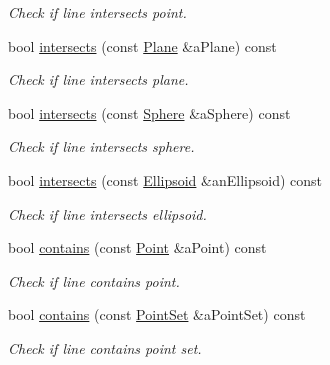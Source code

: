 \begin{DoxyCompactItemize}
\begin{DoxyCompactList}\small\item\em Check if line intersects point. \end{DoxyCompactList}\item 
bool \hyperlink{classostk_1_1math_1_1geom_1_1d3_1_1objects_1_1_line_a292e86df1d673e4f040691b25877a6ce}{intersects} (const \hyperlink{classostk_1_1math_1_1geom_1_1d3_1_1objects_1_1_plane}{Plane} \&a\+Plane) const
\begin{DoxyCompactList}\small\item\em Check if line intersects plane. \end{DoxyCompactList}\item 
bool \hyperlink{classostk_1_1math_1_1geom_1_1d3_1_1objects_1_1_line_a5300ab7d6cbe87cf74de014252956558}{intersects} (const \hyperlink{classostk_1_1math_1_1geom_1_1d3_1_1objects_1_1_sphere}{Sphere} \&a\+Sphere) const
\begin{DoxyCompactList}\small\item\em Check if line intersects sphere. \end{DoxyCompactList}\item 
bool \hyperlink{classostk_1_1math_1_1geom_1_1d3_1_1objects_1_1_line_a72843cbf3252ed608969e7c4d9a1592f}{intersects} (const \hyperlink{classostk_1_1math_1_1geom_1_1d3_1_1objects_1_1_ellipsoid}{Ellipsoid} \&an\+Ellipsoid) const
\begin{DoxyCompactList}\small\item\em Check if line intersects ellipsoid. \end{DoxyCompactList}\item 
bool \hyperlink{classostk_1_1math_1_1geom_1_1d3_1_1objects_1_1_line_a51121a95b14948a800a36f57aa85e55a}{contains} (const \hyperlink{classostk_1_1math_1_1geom_1_1d3_1_1objects_1_1_point}{Point} \&a\+Point) const
\begin{DoxyCompactList}\small\item\em Check if line contains point. \end{DoxyCompactList}\item 
bool \hyperlink{classostk_1_1math_1_1geom_1_1d3_1_1objects_1_1_line_a63fe1d825e847ba201c50ddf2d02ee1e}{contains} (const \hyperlink{classostk_1_1math_1_1geom_1_1d3_1_1objects_1_1_point_set}{Point\+Set} \&a\+Point\+Set) const
\begin{DoxyCompactList}\small\item\em Check if line contains point set. \end{DoxyCompactList}\item 

\end{DoxyCompactItemize}
